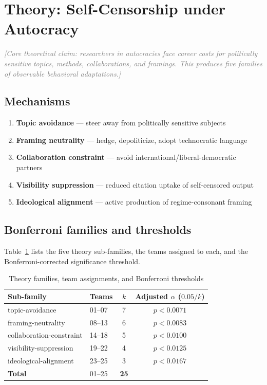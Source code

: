 \documentclass[12pt,a4paper]{article}
\newcommand{\placeholder}[1]{\textcolor{gray}{\textit{[#1]}}}
\newcommand{\kw}[1]{\textbf{#1}}
\begin{document}
\section{Theory: Self-Censorship under Autocracy}
\label{sec:theory}

\placeholder{Core theoretical claim: researchers in autocracies face
career costs for politically sensitive topics, methods, collaborations,
and framings. This produces five families of observable behavioral
adaptations.}

\subsection{Mechanisms}

\begin{enumerate}
  \item \kw{Topic avoidance} --- steer away from politically sensitive subjects
  \item \kw{Framing neutrality} --- hedge, depoliticize, adopt technocratic language
  \item \kw{Collaboration constraint} --- avoid international/liberal-democratic partners
  \item \kw{Visibility suppression} --- reduced citation uptake of self-censored output
  \item \kw{Ideological alignment} --- active production of regime-consonant framing
\end{enumerate}

\subsection{Bonferroni families and thresholds}

Table~\ref{tab:families} lists the five theory sub-families, the teams
assigned to each, and the Bonferroni-corrected significance threshold.

\begin{table}[ht]
\centering
\caption{Theory families, team assignments, and Bonferroni thresholds}
\label{tab:families}
\begin{tabular}{llcc}
\toprule
Sub-family & Teams & $k$ & Adjusted $\alpha$ ($0.05/k$) \\
\midrule
topic-avoidance          & 01--07 & 7 & $p < 0.0071$ \\
framing-neutrality       & 08--13 & 6 & $p < 0.0083$ \\
collaboration-constraint & 14--18 & 5 & $p < 0.0100$ \\
visibility-suppression   & 19--22 & 4 & $p < 0.0125$ \\
ideological-alignment    & 23--25 & 3 & $p < 0.0167$ \\
\midrule
\textbf{Total}           & 01--25 & \textbf{25} & \\
\bottomrule
\end{tabular}
\end{table}
\end{document}
